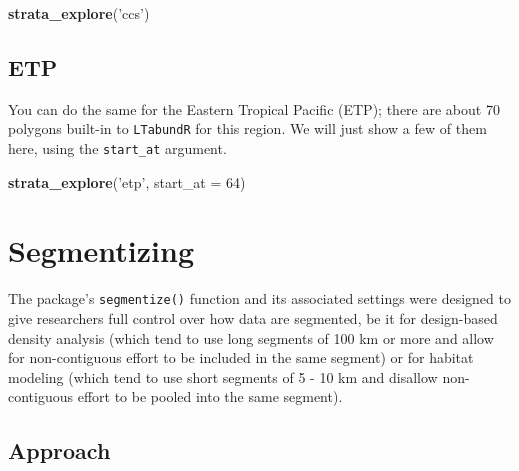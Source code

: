 \documentclass[
]{book}
\newenvironment{Shaded}{\begin{snugshade}}{\end{snugshade}}
\newcommand{\DataTypeTok}[1]{\textcolor[rgb]{0.13,0.29,0.53}{#1}}
\newcommand{\DecValTok}[1]{\textcolor[rgb]{0.00,0.00,0.81}{#1}}
\newcommand{\KeywordTok}[1]{\textcolor[rgb]{0.13,0.29,0.53}{\textbf{#1}}}
\newcommand{\NormalTok}[1]{#1}
\newcommand{\StringTok}[1]{\textcolor[rgb]{0.31,0.60,0.02}{#1}}
\begin{document}
\begin{Shaded}
\begin{Highlighting}[]
\KeywordTok{strata_explore}\NormalTok{(}\StringTok{'ccs'}\NormalTok{)}
\end{Highlighting}
\end{Shaded}

\hypertarget{etp}{%
\section*{ETP}\label{etp}}

You can do the same for the Eastern Tropical Pacific (ETP); there are about 70 polygons built-in to \texttt{LTabundR} for this region. We will just show a few of them here, using the \texttt{start\_at} argument.

\begin{Shaded}
\begin{Highlighting}[]
\KeywordTok{strata_explore}\NormalTok{(}\StringTok{'etp'}\NormalTok{,}
               \DataTypeTok{start_at =} \DecValTok{64}\NormalTok{)}
\end{Highlighting}
\end{Shaded}

\hypertarget{segmentizing}{%
\chapter{Segmentizing}\label{segmentizing}}

The package's \texttt{segmentize()} function and its associated settings were designed to give researchers full control over how data are segmented, be it for design-based density analysis (which tend to use long segments of 100 km or more and allow for non-contiguous effort to be included in the same segment) or for habitat modeling (which tend to use short segments of 5 - 10 km and disallow non-contiguous effort to be pooled into the same segment).

\hypertarget{approach}{%
\section*{Approach}\label{approach}}
\end{document}
